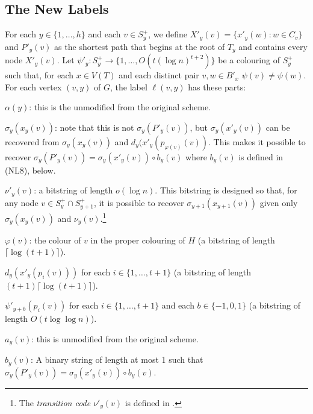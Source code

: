 \documentclass{patmorin}
\begin{document}
\subsection{The New Labels}

For each $y\in\{1,\ldots,h\}$ and each $v\in S^+_y$, we define $X'_y(v)=\{x'_y(w): w\in C_v\}$ and $P'_y(v)$ as the shortest path that begins at the root of $T_y$ and contains every node $X'_y(v)$.  Let $\psi'_y:S^+_y\to\{1,\ldots,O(t(\log n)^{t+2})\}$ be a colouring of $S^+_y$ such that, for each $x\in V(T)$ and each distinct pair $v,w\in B'_x$ $\psi(v)\neq\psi(w)$.  For each vertex $(v,y)$ of $G$, the label $\ell(v,y)$ has these parts:

\begin{compactenum}[(NL1)]
    \item $\alpha(y)$: this is the unmodified from the original scheme.

    \item $\sigma_y(x_y(v))$: note that this is not $\sigma_y(P'_y(v))$, but
    $\sigma_y(x'_y(v))$ can be recovered from $\sigma_y(x_y(v))$ and $d_y(x'_y(p_{\varphi(v)}(v))$. This makes it possible to recover $\sigma_y(P'_y(v))=\sigma_y(x'_y(v))\mathbin{\circ} b_y(v)$ where $b_y(v)$ is defined in (NL8), below.

    \item $\nu'_y(v)$: a bitstring of length $o(\log n)$.  This bitstring is designed so that, for any node $v\in S^+_y\cap S^+_{y+1}$, it is possible to recover $\sigma_{y+1}(x_{y+1}(v))$ given only $\sigma_y(x_y(v))$ and $\nu_y(v)$.\footnote{The \emph{transition code} $\nu'_y(v)$ is defined in \cite[Section~5.3]{dujmovic.esperet.ea:adjacency}.}

    \item $\varphi(v)$: the colour of $v$ in the proper colouring of $H$ (a bitstring of length $\lceil\log(t+1)\rceil$).

    \item $d_y(x'_y(p_i(v)))$ for each $i\in\{1,\ldots,t+1\}$ (a bitstring of length $(t+1)\lceil\log(t+1)\rceil$).

    \item $\psi'_{y+b}(p_i(v))$ for each $i\in\{1,\ldots,t+1\}$ and each $b\in\{-1,0,1\}$ (a bitstring of length $O(t\log\log n)$).\label{psi-prime}

    \item $a_y(v)$: this is unmodified from the original scheme.

    \item $b_y(v)$: A binary string of length at most 1 such that $\sigma_y(P'_y(v))=\sigma_y(x'_y(v))\mathbin{\circ}b_y(v)$.
\end{compactenum}
\end{document}
